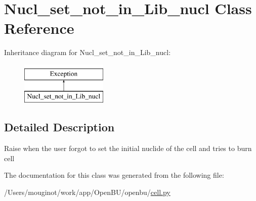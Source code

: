 \hypertarget{classopenbu_1_1cell_1_1_nucl__set__not__in___lib__nucl}{}\section{Nucl\+\_\+set\+\_\+not\+\_\+in\+\_\+\+Lib\+\_\+nucl Class Reference}
\label{classopenbu_1_1cell_1_1_nucl__set__not__in___lib__nucl}
Inheritance diagram for Nucl\+\_\+set\+\_\+not\+\_\+in\+\_\+\+Lib\+\_\+nucl\+:\begin{figure}[H]
\begin{center}
\leavevmode
\includegraphics[height=2.000000cm]{classopenbu_1_1cell_1_1_nucl__set__not__in___lib__nucl}
\end{center}
\end{figure}


\subsection{Detailed Description}
\begin{DoxyVerb}Raise when the user forgot to set the initial nuclide of the cell and tries to burn cell\end{DoxyVerb}
 

The documentation for this class was generated from the following file\+:\begin{DoxyCompactItemize}
\item 
/\+Users/mouginot/work/app/\+Open\+B\+U/openbu/\mbox{\hyperlink{cell_8py}{cell.\+py}}\end{DoxyCompactItemize}
